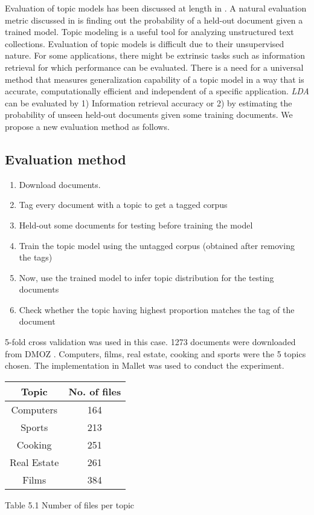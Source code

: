 Evaluation of topic models has been discussed at length in \citep*{wallach2009evaluation}. A natural evaluation metric discussed in 
\citep*{wallach2009evaluation} is finding out the probability of a held-out document given a trained model. Topic modeling is a useful
tool for analyzing unstructured text collections. Evaluation of topic models is difficult due to their unsupervised nature. For some 
applications, there might be extrinsic tasks such as information retrieval for which performance can be evaluated. There is a need for 
a universal method that measures generalization capability of a topic model in a way that is accurate, computationally efficient and
independent of a specific application. \textit{LDA} can be evaluated by 1) Information retrieval accuracy or 2) by estimating the probability
of unseen held-out documents given some training documents. We propose a new evaluation method as follows.

\subsection*{Evaluation method}

\begin{enumerate}
 \item Download documents.
 \item Tag every document with a topic to get a tagged corpus
 \item Held-out some documents for testing before training the model
 \item Train the topic model using the untagged corpus (obtained after removing the tags)
 \item Now, use the trained model to infer topic distribution for the testing documents
 \item Check whether the topic having highest proportion matches the tag of the document
\end{enumerate}

5-fold cross validation was used in this case. 1273 documents were downloaded from DMOZ \citep*{dmoz}. Computers, films, real estate, cooking and
sports were the 5 topics chosen. The implementation in Mallet was used to conduct the experiment.

\begin{center}
\begin{tabular}{ |c|c| }
  \hline
  Topic & No. of files \\ \hline
  Computers & 164 \\ \hline
  Sports & 213 \\ \hline
  Cooking & 251 \\ \hline
  Real Estate & 261 \\ \hline
  Films & 384 \\ \hline
\end{tabular}
\end{center}
\begin{center}
 Table 5.1 Number of files per topic
\end{center}

